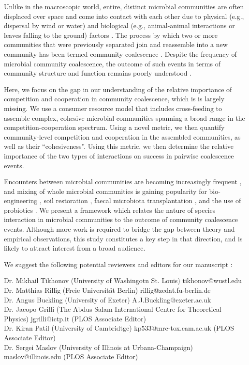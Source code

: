\documentclass[blank]{impletter}
\begin{document}
Unlike in the macroscopic world, entire, distinct microbial communities are often displaced over space and come into contact with each other due to physical (e.g., dispersal by wind or water) and biological (e.g., animal-animal interactions or leaves falling to the ground) factors \cite{Kort2014, Evans2020,Luo2020, Vass2021}. The process by which two or more communities that were previously separated join and reassemble into a new community has been termed community coalescence \cite{Rillig2015}. Despite the frequency of microbial community coalescence, the outcome of such events in terms of community structure and function remains poorly understood \cite{Rillig2016b}.

Here, we focus on the gap in our understanding of the relative importance of competition and cooperation in community coalescence, which is is largely missing. We use a consumer resource model that includes cross-feeding to assemble complex, cohesive microbial communities spanning a broad range in the competition-cooperation spectrum. Using a novel metric, we then quantify community-level competition and cooperation in the assembled communities, as well as their ``cohesiveness''. Using this metric, we then determine the relative importance of the two types of interactions on success in pairwise coalescence events.

Encounters between microbial communities  are becoming increasingly frequent \cite{Seebens2017}, and mixing of whole microbial communities is gaining popularity for bio-engineering \cite{Rillig2016}, soil restoration \cite{Calderon2017}, faecal microbiota transplantation \cite{Wang2019, Wilson2019}, and the use of probiotics \cite{Lindemann2016}. We present a framework which relates the nature of species interaction in microbial communities to the outcome of community coalescence events. Although more work is required to bridge the gap between theory and empirical observations, this study constitutes a key step in that direction, and is likely to attract interest from a broad audience. 

We suggest the following potential reviewers and editors for our manuscript
:


Dr. Mikhail Tikhonov (University of Washingotn St. Louis) tikhonov@wustl.edu\\
Dr. Matthias Rillig (Freie Universität Berlin) rillig@zedat.fu-berlin.de\\
Dr. Angus Buckling (University of Exeter) A.J.Buckling@exeter.ac.uk\\
Dr. Jacopo Grilli (The Abdus Salam International Centre for Theoretical Physics) jgrilli@ictp.it (PLOS Associate Editor)\\
Dr. Kiran Patil (University of Cambridtge)   kp533@mrc-tox.cam.ac.uk (PLOS Associate Editor)\\
Dr. Sergei Maslov (University of Illinois at Urbana-Champaign) maslov@illinois.edu (PLOS Associate Editor)\\
\end{document}
